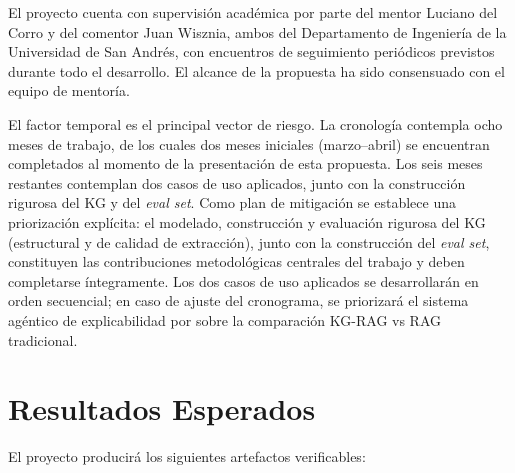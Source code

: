 \documentclass[12pt,a4paper]{article}
\begin{document}
El proyecto cuenta con supervisión académica por parte del mentor Luciano del Corro y del comentor Juan Wisznia, ambos del Departamento de Ingeniería de la Universidad de San Andrés, con encuentros de seguimiento periódicos previstos durante todo el desarrollo. El alcance de la propuesta ha sido consensuado con el equipo de mentoría.

El factor temporal es el principal vector de riesgo. La cronología contempla ocho meses de trabajo, de los cuales dos meses iniciales (marzo--abril) se encuentran completados al momento de la presentación de esta propuesta. Los seis meses restantes contemplan dos casos de uso aplicados, junto con la construcción rigurosa del KG y del \textit{eval set}. Como plan de mitigación se establece una priorización explícita: el modelado, construcción y evaluación rigurosa del KG (estructural y de calidad de extracción), junto con la construcción del \textit{eval set}, constituyen las contribuciones metodológicas centrales del trabajo y deben completarse íntegramente. Los dos casos de uso aplicados se desarrollarán en orden secuencial; en caso de ajuste del cronograma, se priorizará el sistema agéntico de explicabilidad por sobre la comparación KG-RAG vs RAG tradicional.

\section{Resultados Esperados}

El proyecto producirá los siguientes artefactos verificables:
\end{document}
